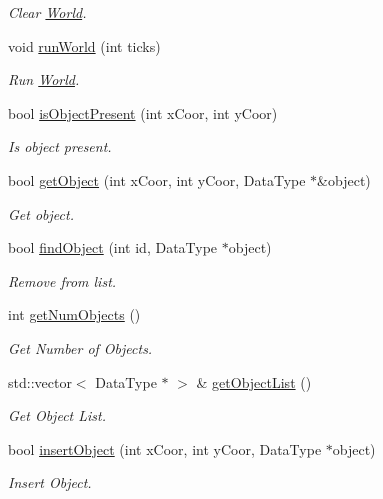 \begin{DoxyCompactItemize}
\begin{DoxyCompactList}\small\item\em Clear \hyperlink{class_world}{World}. \end{DoxyCompactList}\item 
void \hyperlink{class_world_a9cdd2368878d4fed45c60a621b2ff0c0}{run\+World} (int ticks)
\begin{DoxyCompactList}\small\item\em Run \hyperlink{class_world}{World}. \end{DoxyCompactList}\item 
bool \hyperlink{class_world_afcbf777e4ffdfcf6c3d9245376d6a538}{is\+Object\+Present} (int x\+Coor, int y\+Coor)
\begin{DoxyCompactList}\small\item\em Is object present. \end{DoxyCompactList}\item 
bool \hyperlink{class_world_abb9d5ae67756239aa2083c9898de5e15}{get\+Object} (int x\+Coor, int y\+Coor, Data\+Type $\ast$\&object)
\begin{DoxyCompactList}\small\item\em Get object. \end{DoxyCompactList}\item 
bool \hyperlink{class_world_ad1c2d4d37e1d36fb90beceede762daf0}{find\+Object} (int id, Data\+Type $\ast$object)
\begin{DoxyCompactList}\small\item\em Remove from list. \end{DoxyCompactList}\item 
int \hyperlink{class_world_afa6ac3d6800045c803a6b0072a5ab3fb}{get\+Num\+Objects} ()
\begin{DoxyCompactList}\small\item\em Get Number of Objects. \end{DoxyCompactList}\item 
std\+::vector$<$ Data\+Type $\ast$ $>$ \& \hyperlink{class_world_ac2f52f8f041d578ca4f0583349c8f43f}{get\+Object\+List} ()
\begin{DoxyCompactList}\small\item\em Get Object List. \end{DoxyCompactList}\item 
bool \hyperlink{class_world_af07045149e9e92d7c3bfdce180825577}{insert\+Object} (int x\+Coor, int y\+Coor, Data\+Type $\ast$object)
\begin{DoxyCompactList}\small\item\em Insert Object. \end{DoxyCompactList}\item 

\end{DoxyCompactItemize}
